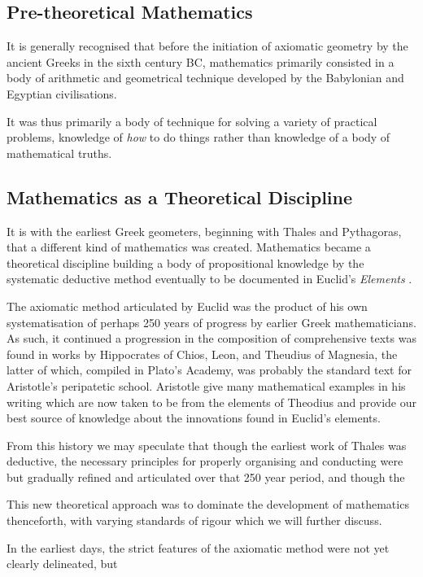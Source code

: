 \documentclass[10pt,titlepage]{book}
\begin{document}
\subsection{Pre-theoretical Mathematics}

It is generally recognised that before the initiation of axiomatic geometry by the ancient Greeks in the sixth century BC, mathematics primarily consisted in a body of arithmetic and geometrical technique developed by the Babylonian and Egyptian civilisations.

It was thus primarily a body of technique for solving a variety of practical problems, knowledge of \emph{how} to do things rather than knowledge of a body of mathematical truths.

\subsection{Mathematics as a Theoretical Discipline}

It is with the earliest Greek geometers, beginning with Thales and Pythagoras, that a different kind of mathematics was created.
Mathematics became a theoretical discipline building a body of propositional knowledge by the systematic deductive method eventually to be documented in Euclid's \emph{Elements} \cite{euclidEL1}.

The axiomatic method articulated by Euclid was the product of his own systematisation of perhaps 250 years of progress by earlier Greek mathematicians.
As such, it continued a progression in the composition of comprehensive texts was found in works by Hippocrates of Chios, Leon, and Theudius of Magnesia, the latter of which, compiled in Plato's Academy, was probably the standard text for Aristotle's peripatetic school.
Aristotle give many mathematical examples in his writing which are now taken to be from the elements of Theodius and provide our best source of knowledge about the innovations found in Euclid's elements.

From this history we may speculate that though the earliest work of Thales was deductive, the necessary principles for properly organising and conducting were but gradually refined and articulated over that 250 year period, and though the 



This new theoretical approach was to dominate the development of mathematics thenceforth, with varying standards of rigour which we will further discuss.

In the earliest days, the strict features of the axiomatic method were not yet clearly delineated, but 
\end{document}
